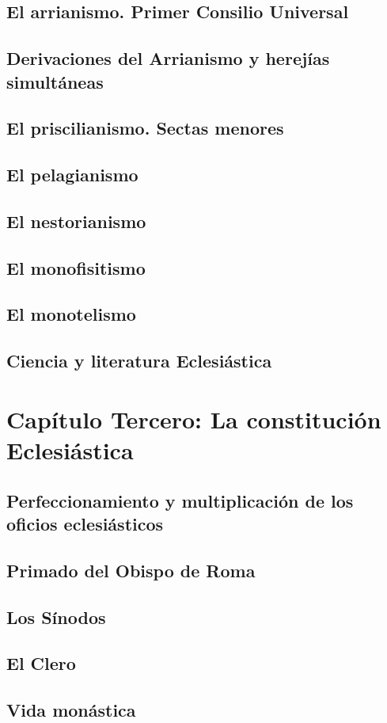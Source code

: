 \raggedbottom{} \documentclass[12pt]{book}
\begin{document}
\section{El arrianismo. Primer Consilio Universal}
\section{Derivaciones del Arrianismo y herejías simultáneas}
\section{El priscilianismo. Sectas menores}
\section{El pelagianismo}
\section{El nestorianismo}
\section{El monofisitismo}
\section{El monotelismo}
\section{Ciencia y literatura Eclesiástica}
\chapter{Capítulo Tercero: La constitución Eclesiástica}
\section{Perfeccionamiento y multiplicación de los oficios eclesiásticos}
\section{Primado del Obispo de Roma}
\section{Los Sínodos}
\section{El Clero}
\section{Vida monástica}
\end{document}
